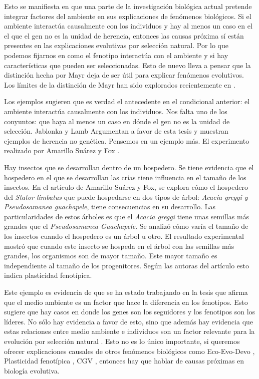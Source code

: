 Esto se manifiesta en que una parte de la investigación biológica actual pretende integrar factores del ambiente en sus explicaciones de fenómenos biológicos. Si el ambiente interactúa causalmente con los individuos y hay al menos un caso en el el que el gen no es la unidad de herencia, entonces las causas próxima sí están presentes en las explicaciones evolutivas por selección natural. Por lo que podemos fijarnos en como el fenotipo interactúa con el ambiente y si hay características que pueden ser seleccionadas. Esto de nuevo lleva a pensar que la distinción hecha por Mayr deja de ser útil para explicar fenómenos evolutivos. Los límites de la distinción de Mayr han sido explorados recientemente en \cite{Uller2020, Dayan2020, Laland2011}.

Los ejemplos sugieren que es verdad el antecedente en el condicional anterior: el ambiente interactúa causalmente con los individuos. Nos falta uno de los conyuntos: que haya al menos un caso en dónde el gen no es la unidad de selección. Jablonka y Lamb Argumentan a favor de esta tesis y muestran ejemplos de herencia no genética. Pensemos en un ejemplo más. El experimento realizado por Amarillo Suárez y Fox \citeyear{Amarillo-Suarez2006}.

Hay insectos que se desarrollan dentro de un hospedero. Se tiene evidencia que el hospedero en el que se desarrollan las crías tiene influencia en el tamaño de los insectos. En el artículo de Amarillo-Suárez y Fox, se explora cómo el hospedero del \emph{Stator limbatus} que puede hospedarse en dos tipos de árbol: \emph{Acacia greggi y Pseudosamanea guachapele}, tiene consecuencias en su desarrollo. Las particularidades de estos árboles es que el \emph{Acacia greggi} tiene unas semillas más grandes que el \emph{Pseudosamanea Guachapele}. Se analizó cómo varía el tamaño de los insectos cuando el hospedero es un árbol u otro. El resultado experimental mostró que cuando este insecto se hospeda en el árbol con las semillas más grandes, los organismos son de mayor tamaño. Este mayor tamaño es independiente al tamaño de los progenitores. Según las autoras del artículo esto indica plasticidad fenotípica.

Este ejemplo es evidencia de que se ha estado trabajando en la tesis que afirma que el medio ambiente es un factor que hace la diferencia en los fenotipos. Esto sugiere que hay casos en donde los genes son los seguidores y los fenotipos son los líderes. No sólo hay evidencia a favor de esto, sino que además hay evidencia que estas relaciones entre medio ambiente e individuos son un factor relevante para la evolución por selección natural \cite{Jablonka2020, Dayan2020, MacColl2011}. Esto no es lo único importante, si queremos ofrecer explicaciones causales de otros fenómenos biológicos como Eco-Evo-Devo \cite{PfenningEco-Evo-Devo}, Plasticidad fenotípica \cite{WESTEBERHARD20082701}, CGV \cite{CVG}, entonces hay que hablar de causas próximas en biología evolutiva.

